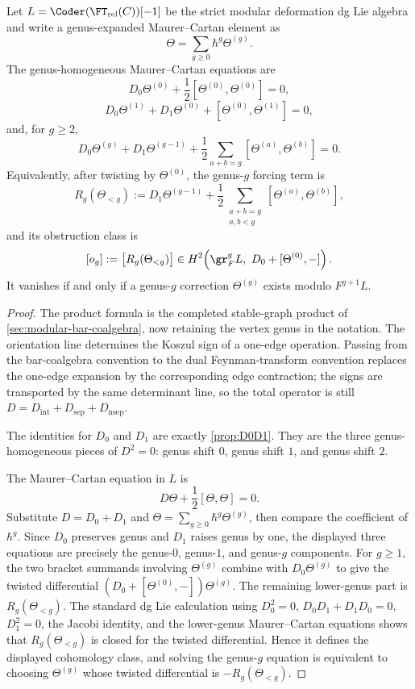 \begin{theorem}
Let $L=\Coder(\FT_{\mathrm{rel}}(C))[-1]$ be the strict modular deformation
dg Lie algebra and write a genus-expanded Maurer--Cartan element as
\[
\Theta=\sum_{g\ge0}\hbar^g\Theta^{(g)}.
\]
The genus-homogeneous Maurer--Cartan equations are
\[
D_0\Theta^{(0)}
+\frac12[\Theta^{(0)},\Theta^{(0)}]=0,
\]
\[
D_0\Theta^{(1)}
+D_1\Theta^{(0)}
+[\Theta^{(0)},\Theta^{(1)}]=0,
\]
and, for $g\ge2$,
\[
D_0\Theta^{(g)}
+D_1\Theta^{(g-1)}
+\frac12\sum_{a+b=g}[\Theta^{(a)},\Theta^{(b)}]=0.
\]
Equivalently, after twisting by $\Theta^{(0)}$, the genus-$g$ forcing term is
\[
R_g(\Theta_{<g})
:=
D_1\Theta^{(g-1)}
+\frac12
\sum_{\substack{a+b=g\\ a,b<g}}
[\Theta^{(a)},\Theta^{(b)}],
\]
and its obstruction class is
\[
[o_g]
:=
\bigl[R_g(\Theta_{<g})\bigr]
\in
H^2\!\left(\gr_F^g L,\ D_0+[\Theta^{(0)},-]\right).
\]
It vanishes if and only if a genus-$g$ correction $\Theta^{(g)}$ exists modulo
$F^{g+1}L$.
\end{theorem}

\begin{proof}
The product formula is the completed stable-graph product of
\cref{sec:modular-bar-coalgebra}, now retaining the vertex genus in the notation.
The orientation line determines the Koszul sign of a one-edge operation. Passing from
the bar-coalgebra convention to the dual Feynman-transform convention replaces the
one-edge expansion by the corresponding edge contraction; the signs are transported by
the same determinant line, so the total operator is still
$D=D_{\mathrm{int}}+D_{\mathrm{sep}}+D_{\mathrm{nsep}}$.

The identities for $D_0$ and $D_1$ are exactly
\cref{prop:D0D1}. They are the three genus-homogeneous pieces of $D^2=0$: genus shift
$0$, genus shift $1$, and genus shift $2$.

The Maurer--Cartan equation in $L$ is
\[
D\Theta+\frac12[\Theta,\Theta]=0.
\]
Substitute $D=D_0+D_1$ and
$\Theta=\sum_{g\ge0}\hbar^g\Theta^{(g)}$, then compare the coefficient of
$\hbar^g$. Since $D_0$ preserves genus and $D_1$ raises genus by one, the displayed
three equations are precisely the genus-$0$, genus-$1$, and genus-$g$ components.
For $g\ge1$, the two bracket summands involving $\Theta^{(g)}$ combine with
$D_0\Theta^{(g)}$ to give the twisted differential
$(D_0+[\Theta^{(0)},-])\Theta^{(g)}$. The remaining lower-genus part is
$R_g(\Theta_{<g})$. The standard dg Lie calculation using
$D_0^2=0$, $D_0D_1+D_1D_0=0$, $D_1^2=0$, the Jacobi identity, and the lower-genus
Maurer--Cartan equations shows that $R_g(\Theta_{<g})$ is closed for the twisted
differential. Hence it defines the displayed cohomology class, and solving the
genus-$g$ equation is equivalent to choosing $\Theta^{(g)}$ whose twisted differential
is $-R_g(\Theta_{<g})$.
\end{proof}


